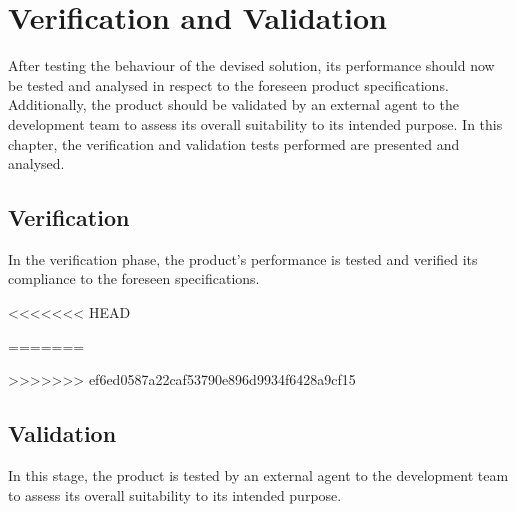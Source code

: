 \chapter{Verification and Validation}%
\label{ch:verif-valid}
After testing the behaviour of the devised solution, its performance should now
be tested and analysed in respect to the foreseen product
specifications. Additionally, the product should be validated by an external
agent to the development team to assess its overall suitability to its intended
purpose. In this chapter, the verification and validation tests performed are
presented and analysed.
%
\section{Verification}%
\label{sec:verification}
In the verification phase, the product's performance is tested and verified its
compliance to the foreseen specifications.
% 

<<<<<<< HEAD

=======

>>>>>>> ef6ed0587a22caf53790e896d9934f6428a9cf15
%
\section{Validation}%
\label{sec:validation}
In this stage, the product is tested by an external agent to the development
team to assess its overall suitability to its intended purpose.
% 
%
%
